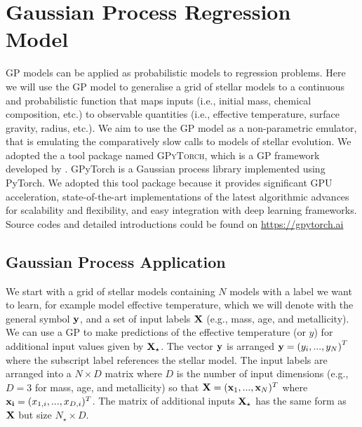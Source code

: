 \section{Gaussian Process Regression Model}\label{GPR}

GP models can be applied as probabilistic models to regression problems.  Here we will use the GP model to generalise a grid of stellar models to a continuous and probabilistic function that maps inputs (i.e., initial mass, chemical composition, etc.) to observable quantities (i.e., effective temperature, surface gravity, radius, etc.).  We aim to use the GP model as a non-parametric emulator, that is emulating the comparatively slow calls to models of stellar evolution. 
%
We adopted the a tool package named \textsc{GPyTorch}, which is a GP framework developed by \citep{gardner2018gpytorch}. GPyTorch is a Gaussian process library implemented using PyTorch. We adopted this tool package because it provides significant GPU acceleration, state-of-the-art implementations of the latest algorithmic advances for scalability and flexibility, and easy integration with deep learning frameworks. Source codes and detailed introductions could be found on \url{https://gpytorch.ai} 


\subsection{Gaussian Process Application}

We start with a grid of stellar models containing $N$ models with a label we want to learn, for example model effective temperature, which we will denote with the general symbol $\bf y$, and a set of input labels $\bf X$ (e.g., mass, age, and metallicity).  We can use a GP to make predictions of the effective temperature (or $y$) for additional input values given by $\bf X_{\star}$.  The vector $\bf y$ is arranged ${\bf y} = \left(y_{i}, ... ,y_{N} \right)^{T}$ where the subscript label references the stellar model.  The input labels are arranged into a $N \times D$ matrix where $D$ is the number of input dimensions (e.g., $D=3$ for mass, age, and metallicity) so that ${\bf X} = ({\bf x}_{1}, ..., {\bf x}_{N})^{T}$ where ${\bf x_{i}} = (x_{1, i}, ..., x_{D, i})^{T}$.  The matrix of additional inputs $\bf X_{\star}$ has the same form as $\bf X$ but size $N_{\star} \times D$.

